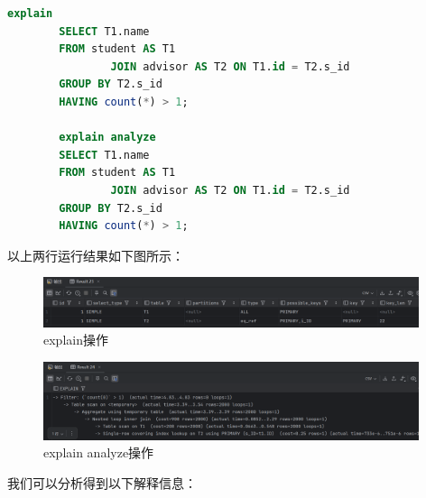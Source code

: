 \documentclass{article}
\begin{document}
	\begin{lstlisting}[language=sql, title=执行以下语句，获取并解释该查询执行计划, tabsize=4]
		explain
		SELECT T1.name
		FROM student AS T1
				JOIN advisor AS T2 ON T1.id = T2.s_id
		GROUP BY T2.s_id
		HAVING count(*) > 1;
		
		explain analyze
		SELECT T1.name
		FROM student AS T1
				JOIN advisor AS T2 ON T1.id = T2.s_id
		GROUP BY T2.s_id
		HAVING count(*) > 1;
	\end{lstlisting}
	
	以上两行运行结果如下图所示：
	
	\begin{figure}[H]
		\centering
		\includegraphics[width=11cm]{./images/6.解释操作1.png}
		\caption{explain操作}
	\end{figure}
	
	\begin{figure}[H]
		\centering
		\includegraphics[width=11cm]{./images/7.解释操作2.png}
		\caption{explain analyze操作}
	\end{figure}
	
	我们可以分析得到以下解释信息：
	
\end{document}
